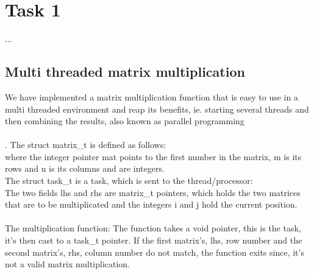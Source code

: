 %
%
%

\section{Task 1}
...


\subsection{Multi threaded matrix multiplication}
We have implemented a matrix multiplication function that is easy to use in a
multi threaded environment and reap its benefits, ie. starting several threads
and then combining the results, also known as parallel programming\\
\\.
The \textsf{struct matrix\_t} is defined as follows:\\
where the integer pointer \textsf{mat} points to the first number in the matrix,
\textsf{m} is its rows and \textsf{n} is its columns and are integers.\\
The \textsf{struct task\_t} is a task, which is sent to the thread/processor:\\
The two fields \textsf{lhs} and \textsf{rhs} are matrix\_t pointers, which holds the two
matrices that are to be multiplicated and the integers \textsf{i} and \textsf{j} hold
the current position.\\
\\
The multiplication function:
The function takes a void pointer, this is the task, it's then cast to a task\_t
pointer. If the first matrix's, lhs, row number and the second matrix's, rhs,
column number do not match, the function exits since, it's not a valid matrix
multiplication.



